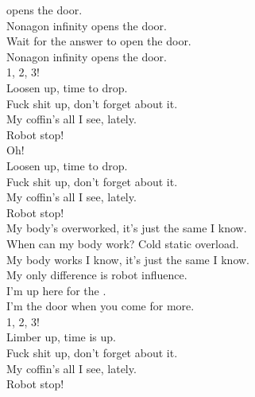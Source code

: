 
\label{album:nonagon-infinity}




 opens the door. \\
Nonagon infinity opens the door. \\
Wait for the answer to open the door. \\
Nonagon infinity opens the door. \\

1, 2, 3! \\

Loosen up, time to drop. \\
Fuck shit up, don't forget about it. \\
My coffin's all I see, lately. \\
Robot stop! \\

Oh! \\

Loosen up, time to drop. \\
Fuck shit up, don't forget about it. \\
My coffin's all I see, lately. \\
Robot stop! \\

My body's overworked, it's just the same I know. \\
When can my body work? Cold static overload. \\
My body works I know, it's just the same I know. \\
My only difference is robot influence. \\

I'm up here for the . \\
I'm the door when you come for more. \\

1, 2, 3! \\

Limber up, time is up. \\
Fuck shit up, don't forget about it. \\
My coffin's all I see, lately. \\
Robot stop! \\

